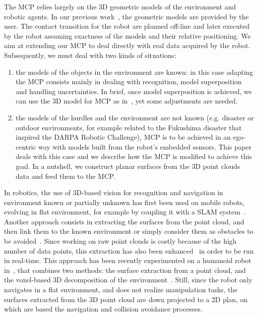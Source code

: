The MCP relies largely on the 3D geometric models of the environment and robotic agents. In our previous work~\cite{escande:ras:2013,bouyarmane:ar:2012}, the geometric models are provided by the user. The contact transition for the robot are planned off-line and later executed by the robot assuming exactness of the models and their relative positioning. We aim at extending our MCP to deal directly with real data acquired by the robot. Subsequently, we must deal with two kinds of situations:
\begin{enumerate}
	\item the models of the objects in the environment are known: in this case adapting the MCP consists mainly in dealing with recognition, model superposition and handling uncertainties. In brief, once model superposition is achieved, we can use the 3D model for MCP as in~\cite{escande:ras:2013,bouyarmane:ar:2012}, yet some adjustments are needed.  
	\item the models of the hurdles and the environment are not known (e.g. disaster or outdoor environments, for example related to the Fukushima disaster that inspired the DARPA Robotic Challenge), MCP is to be achieved in an ego-centric way with models built from the robot's embedded sensors. This paper deals with this case and we describe how the MCP is modified to achieve this goal. In a nutshell, we construct planar surfaces from the 3D point clouds data and feed them to the MCP.
\end{enumerate}

In robotics, the use of 3D-based vision for recognition and navigation in environment known or partially unknown has first been used on mobile robots, evolving in flat environment, for example by coupling it with a SLAM system~\cite{whitty:acra:2012}. Another approach consists in extracting the surfaces from the point cloud, and then link them to the known environment or simply consider them as obstacles to be avoided~\cite{poppinga:iros:2008}. Since working on raw point clouds is costly because of the high number of data points, this extraction has also been enhanced~\cite{biswas:icra:2012} in order to be run in real-time. This approach has been recently experimented on a humanoid robot in~\cite{maier:humanoids:2012}, that combines two methods: the surface extraction from a point cloud, and the voxel-based 3D decomposition of the environment~\cite{nakhaei:humanoids:2008}. Still, since the robot only navigates in a flat environment, and does not realize manipulation tasks, the surfaces extracted from the 3D point cloud are down projected to a 2D plan, on which are based the navigation and collision avoidance processes.

